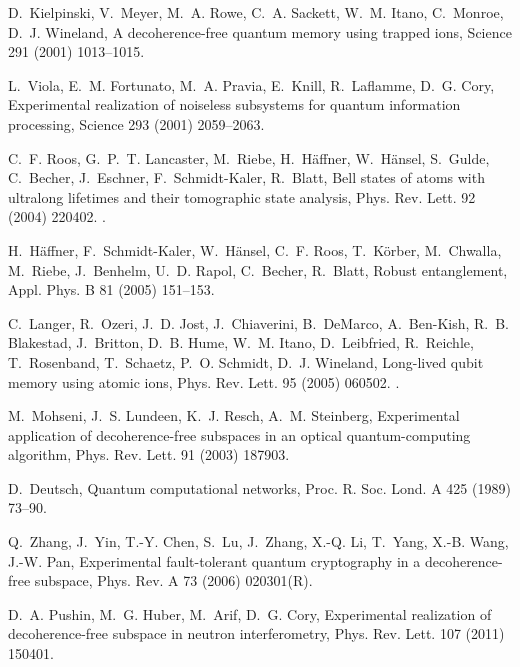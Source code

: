 \documentclass[3p,sort&compress,12pt]{elsarticle}
\begin{document}
\begin{thebibliography}{100}
D.~Kielpinski, V.~Meyer, M.~A. Rowe, C.~A. Sackett, W.~M. Itano, C.~Monroe,
  D.~J. Wineland, A decoherence-free quantum memory using trapped ions, Science
  291 (2001) 1013--1015.

L.~Viola, E.~M. Fortunato, M.~A. Pravia, E.~Knill, R.~Laflamme, D.~G. Cory,
  Experimental realization of noiseless subsystems for quantum information
  processing, Science 293 (2001) 2059--2063.

C.~F. Roos, G.~P.~T. Lancaster, M.~Riebe, H.~H\"affner, W.~H\"ansel, S.~Gulde,
  C.~Becher, J.~Eschner, F.~Schmidt-Kaler, R.~Blatt, Bell states of atoms with
  ultralong lifetimes and their tomographic state analysis, Phys. Rev. Lett. 92
  (2004) 220402.
\newblock \href {http://dx.doi.org/10.1103/PhysRevLett.92.220402}
  {}.

H.~H{\"a}ffner, F.~Schmidt-Kaler, W.~H{\"a}nsel, C.~F. Roos, T.~K{\"o}rber,
  M.~Chwalla, M.~Riebe, J.~Benhelm, U.~D. Rapol, C.~Becher, R.~Blatt, Robust
  entanglement, Appl. Phys. B 81 (2005) 151--153.

C.~Langer, R.~Ozeri, J.~D. Jost, J.~Chiaverini, B.~DeMarco, A.~Ben-Kish, R.~B.
  Blakestad, J.~Britton, D.~B. Hume, W.~M. Itano, D.~Leibfried, R.~Reichle,
  T.~Rosenband, T.~Schaetz, P.~O. Schmidt, D.~J. Wineland, Long-lived qubit
  memory using atomic ions, Phys. Rev. Lett. 95 (2005) 060502.
\newblock \href {http://dx.doi.org/10.1103/PhysRevLett.95.060502}
  {}.

M.~Mohseni, J.~S. Lundeen, K.~J. Resch, A.~M. Steinberg, Experimental
  application of decoherence-free subspaces in an optical quantum-computing
  algorithm, Phys. Rev. Lett. 91 (2003) 187903.

D.~Deutsch, Quantum computational networks, Proc. R. Soc. Lond. A 425 (1989)
  73--90.

Q.~Zhang, J.~Yin, T.-Y. Chen, S.~Lu, J.~Zhang, X.-Q. Li, T.~Yang, X.-B. Wang,
  J.-W. Pan, Experimental fault-tolerant quantum cryptography in a
  decoherence-free subspace, Phys. Rev. A 73 (2006) 020301(R).

D.~A. Pushin, M.~G. Huber, M.~Arif, D.~G. Cory, Experimental realization of
  decoherence-free subspace in neutron interferometry, Phys. Rev. Lett. 107
  (2011) 150401.


\end{thebibliography}
\end{document}
